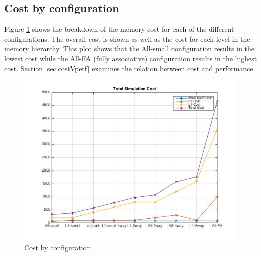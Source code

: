 \documentclass[11pt,titlepage]{article}
\begin{document}
    \subsection{Cost by configuration}
        Figure \ref{fig:totCost} shows the breakdown of the memory cost for each of the different configurations. The overall cost is shown as well as the cost for each level in the memory hierarchy. This plot shows that the All-small configuration results in the lowest cost while the All-FA (fully associative) configuration results in the highest cost. Section \ref{sec:costVperf} examines the relation between cost and performance.
        \begin{figure}[H]
            \centering
            \includegraphics[scale=0.75]{totalCost}
            \caption{Cost by configuration}
            \label{fig:totCost}
        \end{figure}
\end{document}
